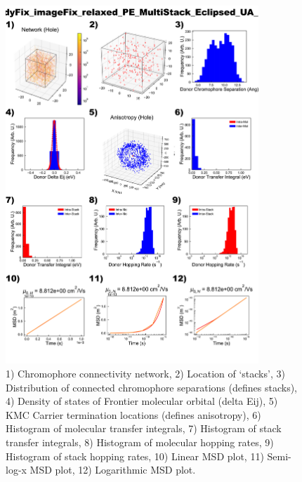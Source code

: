 \documentclass[12pt]{article}
\begin{document}
\begin{figure}[h]\centering
	\includegraphics[width=0.85\textwidth]{Figures/PE_MultiStack_Eclipsed.png}
    \caption{   1) Chromophore connectivity network, 
                2) Location of `stacks', 
                3) Distribution of connected chromophore separations (defines stacks),
                4) Density of states of Frontier molecular orbital (delta Eij),
                5) KMC Carrier termination locations (defines anisotropy),
                6) Histogram of molecular transfer integrals,
                7) Histogram of stack transfer integrals,
                8) Histogram of molecular hopping rates,
                9) Histogram of stack hopping rates,
                10) Linear MSD plot,
                11) Semi-log-x MSD plot,
                12) Logarithmic MSD plot.}
	\label{fig:PEMultEcl}
\end{figure}
\end{document}
